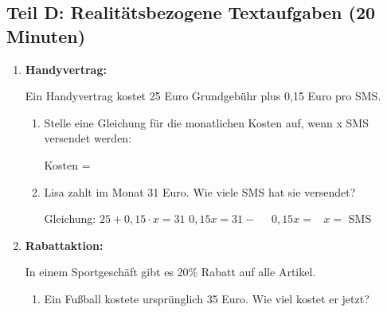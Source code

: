 \subsection*{Teil D: Realitätsbezogene Textaufgaben (20 Minuten)}

\begin{enumerate}[label=\arabic*., resume]

    \item \textbf{Handyvertrag:}

    Ein Handyvertrag kostet 25 Euro Grundgebühr plus 0,15 Euro pro SMS.

    \vspace{0.5cm}

    \begin{enumerate}[label=\alph*)]
        \item Stelle eine Gleichung für die monatlichen Kosten auf, wenn x SMS versendet werden:

        \vspace{0.3cm}
        Kosten = \underline{\hspace{6cm}}

        \vspace{0.5cm}

        \item Lisa zahlt im Monat 31 Euro. Wie viele SMS hat sie versendet?

        \vspace{0.3cm}
        Gleichung: $25 + 0{,}15 \cdot x = 31$
        \vspace{0.3cm}
        $0{,}15x = 31 - \phantom{00}$
        \vspace{0.3cm}
        $0{,}15x = \phantom{0}$
        \vspace{0.3cm}
        $x = $ \underline{\hspace{2cm}} SMS

    \end{enumerate}

    \vspace{1cm}

    \item \textbf{Rabattaktion:}

    In einem Sportgeschäft gibt es 20\% Rabatt auf alle Artikel.

    \vspace{0.5cm}

    \begin{enumerate}[label=\alph*)]
        \item Ein Fußball kostete ursprünglich 35 Euro. Wie viel kostet er jetzt?


\end{enumerate}
\end{enumerate}

